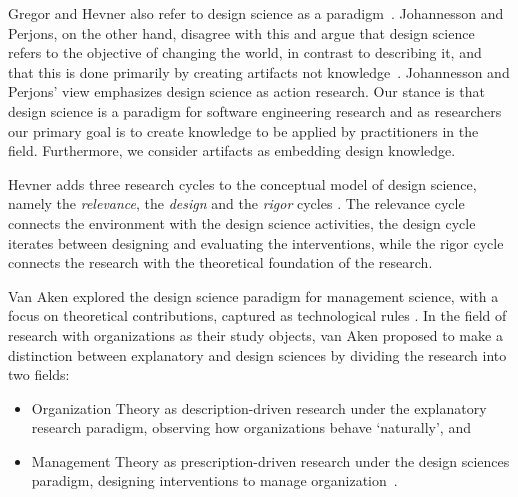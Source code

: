\documentclass[graybox]{svmult}
\newcommand{\emelie}[1]{\textcolor{red}{{\it [Emelie says: #1]}}}
\newcommand{\emelie}[1]{}
\begin{document}

Gregor and Hevner also refer to design science as a paradigm~\cite{gregor_positioning_2013}. Johannesson and Perjons, on the other hand, disagree with this and argue that design science refers to the objective of changing the world, in contrast to describing it, and that this is done primarily by creating artifacts not knowledge~\cite{johannesson_introduction_2014}. Johannesson and Perjons' view emphasizes design science as action research. Our stance is that design science is a paradigm for software engineering research and as researchers our primary goal is to create knowledge to be applied by practitioners in the field. Furthermore, we consider artifacts as embedding design knowledge. 

Hevner adds three research cycles to the conceptual model of design science, namely the \emph{relevance}, the \emph{design} and the \emph{rigor} cycles \cite{Hevner2007}. The relevance cycle connects the environment with the design science activities, the design  cycle iterates between designing and evaluating the interventions, while the rigor cycle connects the research with the theoretical foundation of the research.



Van Aken explored the design science paradigm for management science, with a focus on theoretical contributions, captured as technological rules \cite{van_aken_management_2004,van_aken_management_2005}. 
In the field of research with organizations as their study objects, van Aken proposed to make a distinction between explanatory and design sciences by dividing the research into two fields: 
\begin{itemize}
\item Organization Theory as description-driven research under the explanatory research paradigm, observing how organizations behave `naturally', and 
\item Management Theory as prescription-driven research under the design sciences paradigm, designing interventions to manage organization~\cite{van_aken_management_2004}.  
\end{itemize}
\end{document}

